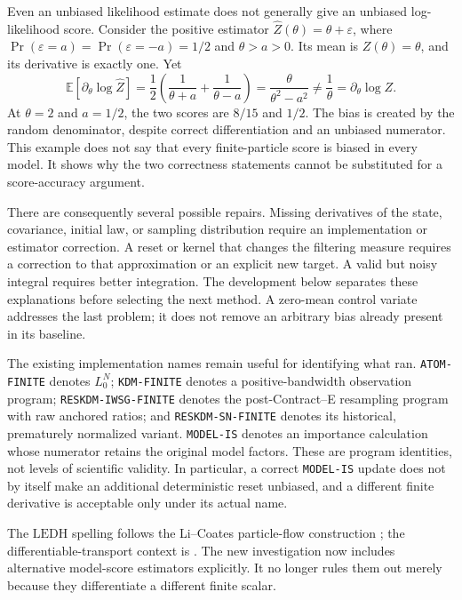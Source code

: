 \documentclass[11pt]{article}
\newcommand{\LEDH}{\ensuremath{\mathrm{LEDH}}}
\begin{document}
Even an unbiased likelihood estimate does not generally give an unbiased
log-likelihood score. Consider the positive estimator
$\widehat Z(\theta)=\theta+\varepsilon$, where
$\Pr(\varepsilon=a)=\Pr(\varepsilon=-a)=1/2$ and $\theta>a>0$.
Its mean is $Z(\theta)=\theta$, and its derivative is exactly one. Yet
\begin{equation}
 \mathbb E\left[\partial_\theta\log\widehat Z\right]
 =\frac12\left(\frac1{\theta+a}+\frac1{\theta-a}\right)
 =\frac{\theta}{\theta^2-a^2}\ne\frac1\theta
 =\partial_\theta\log Z.
 \label{eq:unbiased-value-biased-score}
\end{equation}
At $\theta=2$ and $a=1/2$, the two scores are $8/15$ and $1/2$.
The bias is created by the random denominator, despite correct
differentiation and an unbiased numerator. This example does not say that
every finite-particle score is biased in every model. It shows why the two
correctness statements cannot be substituted for a score-accuracy argument.

There are consequently several possible repairs. Missing derivatives of the
state, covariance, initial law, or sampling distribution require an
implementation or estimator correction. A reset or kernel that changes the
filtering measure requires a correction to that approximation or an explicit
new target. A valid but noisy integral requires better integration. The
development below separates these explanations before selecting the next
method. A zero-mean control variate addresses the last problem; it does not
remove an arbitrary bias already present in its baseline.

The existing implementation names remain useful for identifying what ran.
\texttt{ATOM-FINITE} denotes $L_0^N$; \texttt{KDM-FINITE} denotes a
positive-bandwidth observation program; \texttt{RESKDM-IWSG-FINITE} denotes
the post-Contract--E resampling program with raw anchored ratios; and
\texttt{RESKDM-SN-FINITE} denotes its historical, prematurely normalized
variant. \texttt{MODEL-IS} denotes an importance calculation whose numerator
retains the original model factors. These are program identities, not levels
of scientific validity. In particular, a correct \texttt{MODEL-IS} update
does not by itself make an additional deterministic reset unbiased, and a
different finite derivative is acceptable only under its actual name.

The \LEDH{} spelling follows the Li--Coates particle-flow construction
\citep{li2017particle}; the differentiable-transport context is
\citet{corenflos2021differentiable}. The new investigation now includes
alternative model-score estimators explicitly. It no longer rules them out
merely because they differentiate a different finite scalar.
\end{document}
